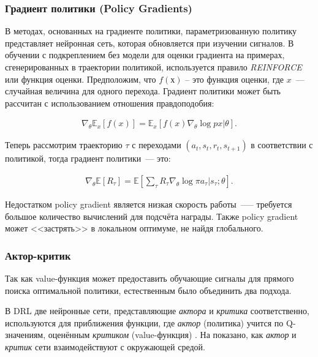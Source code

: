 \subsubsection{Градиент политики (Policy Gradients)}

В методах, основанных на градиенте политики, параметризованную политику представляет нейронная сеть, которая обновляется при изучении сигналов. В обучении с подкреплением без модели для оценки градиента на примерах, сгенерированных в траектории политикой, используется правило {\itshape REINFORCE} или функция оценки. Предположим, что $f(х)$ – это функция оценки, где $x$~--- случайная величина для одного перехода. Градиент политики может быть рассчитан с использованием отношения правдоподобия:

\begin{equation}
    \label{eq:ch1-likelihood-ratios}
    \begin{multlined}
        \nabla_\theta \mathbb{E}_x[f(x)] = \mathbb{E}_x[f(x) \nabla_\theta \log p x|\theta].
    \end{multlined}
\end{equation}

Теперь рассмотрим траекторию $\tau$ с переходами $(a_t, s_t, r_t, s_{t+1})$ в соответствии с политикой, тогда градиент политики~--- это:

\begin{equation}
    \label{eq:ch1-likelihood-ratios}
    \begin{multlined}
        \nabla_\theta \mathbb{E}[R_\tau] = \mathbb{E}[\sum_\tau R_\tau \nabla_\theta \log \pi {a_\tau|s_\tau;\theta}].
    \end{multlined}
\end{equation}

Недостатком policy gradient является низкая скорость работы~—-- требуется большое количество вычислений для подсчёта награды. Также policy gradient может <<застрять>> в локальном оптимуме, не найдя глобального.

\subsubsection{Актор-критик}

Так как value-функция может предоставить обучающие сигналы для прямого поиска оптимальной политики, естественным было объединить два подхода.

В DRL две нейронные сети, представляющие \textit{актора} и \textit{критика} соответственно, используются для приближения функции, где \textit{актор} (политика) учится по Q-значениям, оценённым \textit{критиком} (value-функция) \cite{Arulkumaran_2017}. На  показано, как \textit{актор} и \textit{критик} сети взаимодействуют с окружающей средой.

